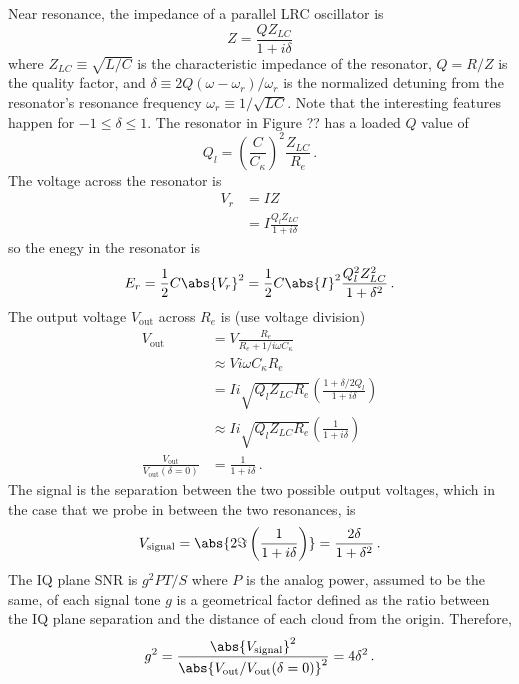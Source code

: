 
Near resonance, the impedance of a parallel LRC oscillator is
\begin{equation}
  Z = \frac{Q Z_{LC}}{1 + i \delta}
\end{equation}
where $Z_{LC} \equiv \sqrt{L/C}$ is the characteristic impedance of the resonator, $Q = R/Z$ is the quality factor, and $\delta \equiv 2 Q (\omega - \omega_r)/\omega_r$ is the normalized detuning from the resonator's resonance frequency $\omega_r \equiv 1/\sqrt{LC}$.
Note that the interesting features happen for $-1 \leq \delta \leq 1$.
The resonator in Figure ?? has a loaded $Q$ value of
\begin{equation}
  Q_l = \left( \frac{C}{C_\kappa} \right)^2 \frac{Z_{LC}}{R_e} \, .
\end{equation}
The voltage across the resonator is
\begin{align*}
  V_r
  &= I Z \\
  &= I \frac{Q_l Z_{LC}}{1 + i \delta}
\end{align*}
so the enegy in the resonator is
\begin{equation}
  E_r = \frac{1}{2} C \abs{V_r}^2 = \frac{1}{2} C \abs{I}^2 \frac{Q_l^2 Z_{LC}^2}{1 + \delta^2} \, .
\end{equation}
The output voltage $V_\text{out}$ across $R_e$ is (use voltage division)
\begin{align}
  V_\text{out}
  & = V \frac{R_e}{R_e + 1/i\omega C_\kappa} \\
  & \approx V i \omega C_\kappa R_e \\
  & = I i \sqrt{Q_l Z_{LC} R_e} \left( \frac{1 + \delta/2Q_l}{1 + i \delta} \right) \\
  & \approx I i \sqrt{Q_l Z_{LC} R_e} \left( \frac{1}{1 + i \delta} \right) \\
  \frac{V_\text{out}}{V_\text{out}(\delta=0)} &= \frac{1}{1 + i \delta} \, .
\end{align}
The signal is the separation between the two possible output voltages, which in the case that we probe in between the two resonances, is
\begin{equation}
  V_\text{signal}
  = \abs{2 \Im \left( \frac{1}{1 + i \delta} \right)}
  = \frac{2 \delta}{1 + \delta^2} \, .
\end{equation}
The IQ plane SNR is $g^2 P T / S$ where $P$ is the analog power, assumed to be the same, of each signal tone $g$ is a geometrical factor defined as the ratio between the IQ plane separation and the distance of each cloud from the origin.
Therefore,
\begin{equation}
  g^2 = \frac{\abs{V_\text{signal}}^2}{\abs{V_\text{out}/V_\text{out}(\delta=0)}^2}
      = 4 \delta^2 \, .
\end{equation}

